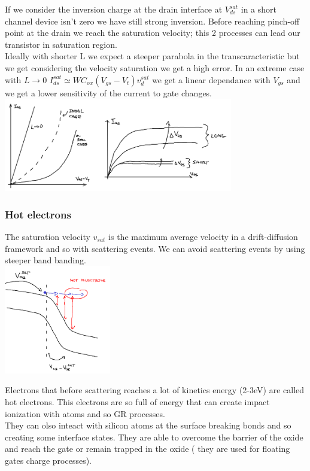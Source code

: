 If we consider the inversion charge at the drain interface at $V_{ds}^{sat}$ in a short channel device isn't zero we have still strong inversion. Before reaching pinch-off point at the drain we reach the saturation velocity; this 2 processes can lead our transistor in saturation region.\\
Ideally with shorter L we expect a steeper parabola in the transcaracteristic but we get considering the velocity saturation we get a high error. In an extreme case with $L\rightarrow 0$ $I_{ds}^{sat}\simeq WC_{ox}(V_{gs}-V_t)v_d^{sat}$ we get a linear dependance with $V_{gs}$ and we get a lower sensitivity of the current to gate changes.\\

\centering
\includegraphics[width=0.75\textwidth]{shorta.png}\\
\raggedright

\subsubsection{Hot electrons}
The saturation velocity $v_{sat}$ is the maximum average velocity in a drift-diffusion framework and so with scattering events. We can avoid scattering events by using steeper band banding.\\

\centering
\includegraphics[width=0.35\textwidth]{hotelectrons.png}\\
\raggedright

Electrons that before scattering reaches a lot of kinetics energy (2-3eV) are called hot electrons. This electrons are so full of energy that can create impact ionization with atoms and so GR processes.\\
They can olso inteact with silicon atoms at the surface breaking bonds and so creating some interface states. They are able to overcome the barrier of the oxide and reach the gate or remain trapped in the oxide ( they are used for floating gates charge processes).\\



